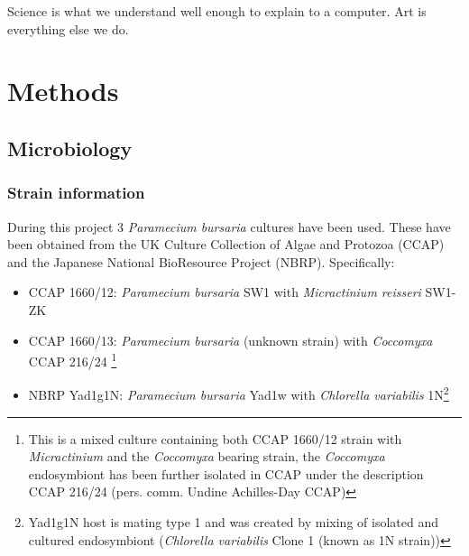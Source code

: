 \graphicspath{{chapters/2.Methods/figures/}}

\begin{savequote}[75mm]
    Science is what we understand well enough to explain to a computer. Art is everything else we do.
\end{savequote}

\chapter{Methods}

\section{Microbiology}
\subsection{Strain information}
During this project 3 \textit{Paramecium bursaria} cultures have been used.  These have been obtained from 
the UK Culture Collection of Algae and Protozoa (CCAP) and the Japanese National BioResource Project (NBRP).
Specifically:
\begin{itemize}
    \item CCAP 1660/12: \textit{Paramecium bursaria} SW1 with \textit{Micractinium reisseri} SW1-ZK \citep{Hoshina2010}
    \item CCAP 1660/13: \textit{Paramecium bursaria} (unknown strain) with \textit{Coccomyxa} CCAP 216/24 \footnote{This is a mixed culture 
            containing both CCAP 1660/12 strain with \textit{Micractinium} and the \textit{Coccomyxa} bearing strain, 
        the \textit{Coccomyxa} endosymbiont has been further isolated in CCAP under the description CCAP 216/24 (pers. comm. Undine Achilles-Day CCAP)}
    \item NBRP Yad1g1N: \textit{Paramecium bursaria} Yad1w with \textit{Chlorella variabilis} 1N\footnote{
        Yad1g1N host is mating type 1 and was created by mixing of isolated and 
        cultured endosymbiont (\textit{Chlorella variabilis} Clone 1 (known as 1N strain))
        }
\end{itemize}

